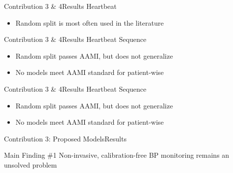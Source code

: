 \begin{frame}{Contribution 3 \& 4}{Results}
    \centering
    Heartbeat
    \begin{figure}
        
        \hfill
        
    \end{figure}
    \begin{itemize}
        \item Random split is most often used in the literature
    \end{itemize}
\end{frame}


\begin{frame}{Contribution 3 \& 4}{Results}
    \centering
    Heartbeat Sequence
    \begin{figure}
        
        \hfill
        
    \end{figure}
    \begin{itemize}
        \item Random split passes AAMI, but does not generalize
        \item No models meet AAMI standard for patient-wise
    \end{itemize}
\end{frame}

\begin{frame}{Contribution 3 \& 4}{Results}
    \centering
    Heartbeat Sequence
    \begin{figure}
        
        \hfill
        
    \end{figure}
    \begin{itemize}
        \item Random split passes AAMI, but does not generalize
        \item No models meet AAMI standard for patient-wise
    \end{itemize}
\end{frame}

\begin{frame}{Contribution 3: Proposed Models}{Results}
    \begin{block}{Main Finding \#1}
        Non-invasive, calibration-free BP monitoring remains an unsolved problem
    \end{block}
\end{frame}

